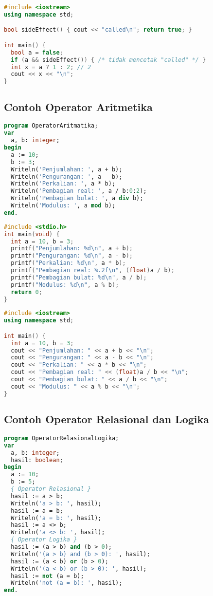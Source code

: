 \documentclass[../main.tex]{subfiles}
\begin{document}
\begin{lstlisting}[language=C++, caption={Short-circuit dan operator kondisional}]
#include <iostream>
using namespace std;

bool sideEffect() { cout << "called\n"; return true; }

int main() {
  bool a = false;
  if (a && sideEffect()) { /* tidak mencetak "called" */ }
  int x = a ? 1 : 2; // 2
  cout << x << "\n";
}
\end{lstlisting}

\subsection{Contoh Operator Aritmetika}
\begin{lstlisting}[language=Pascal, caption={Operator aritmetika di Pascal}]
program OperatorAritmatika;
var
  a, b: integer;
begin
  a := 10;
  b := 3;
  Writeln('Penjumlahan: ', a + b);
  Writeln('Pengurangan: ', a - b);
  Writeln('Perkalian: ', a * b);
  Writeln('Pembagian real: ', a / b:0:2);
  Writeln('Pembagian bulat: ', a div b);
  Writeln('Modulus: ', a mod b);
end.
\end{lstlisting}

\begin{lstlisting}[language=C, caption={Operator aritmetika di C}]
#include <stdio.h>
int main(void) {
  int a = 10, b = 3;
  printf("Penjumlahan: %d\n", a + b);
  printf("Pengurangan: %d\n", a - b);
  printf("Perkalian: %d\n", a * b);
  printf("Pembagian real: %.2f\n", (float)a / b);
  printf("Pembagian bulat: %d\n", a / b);
  printf("Modulus: %d\n", a % b);
  return 0;
}
\end{lstlisting}

\begin{lstlisting}[language=C++, caption={Operator aritmetika di C++}]
#include <iostream>
using namespace std;

int main() {
  int a = 10, b = 3;
  cout << "Penjumlahan: " << a + b << "\n";
  cout << "Pengurangan: " << a - b << "\n";
  cout << "Perkalian: " << a * b << "\n";
  cout << "Pembagian real: " << (float)a / b << "\n";
  cout << "Pembagian bulat: " << a / b << "\n";
  cout << "Modulus: " << a % b << "\n";
}
\end{lstlisting}

\subsection{Contoh Operator Relasional dan Logika}
\begin{lstlisting}[language=Pascal, caption={Operator relasional dan logika di Pascal}]
program OperatorRelasionalLogika;
var
  a, b: integer;
  hasil: boolean;
begin
  a := 10;
  b := 5;
  { Operator Relasional }
  hasil := a > b;
  Writeln('a > b: ', hasil);
  hasil := a = b;
  Writeln('a = b: ', hasil);
  hasil := a <> b;
  Writeln('a <> b: ', hasil);
  { Operator Logika }
  hasil := (a > b) and (b > 0);
  Writeln('(a > b) and (b > 0): ', hasil);
  hasil := (a < b) or (b > 0);
  Writeln('(a < b) or (b > 0): ', hasil);
  hasil := not (a = b);
  Writeln('not (a = b): ', hasil);
end.
\end{lstlisting}
\end{document}
